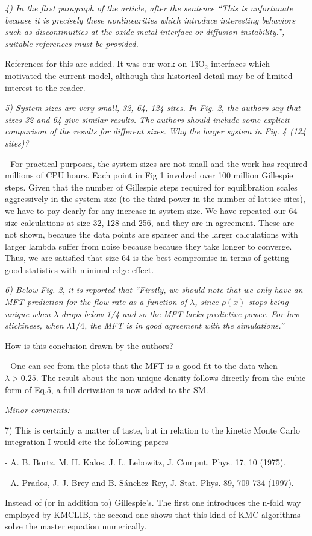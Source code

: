 \documentclass[a4paper,10pt]{article}
\begin{document}
{\it    4) In the first paragraph of the article, after the sentence ``This is
   unfortunate because it is precisely these nonlinearities which
   introduce interesting behaviors such as discontinuities at the
   oxide-metal interface or diffusion instability.'', suitable references
   must be provided.}
  
   References for this are added.  It was our work on $\mathrm{TiO}_2$ interfaces
   which motivated the current model, although this historical
   detail may be of limited interest to the reader.
  
{\it   5) System sizes are very small, 32, 64, 124 sites. In Fig. 2, the
   authors say that sizes 32 and 64 give similar results. The authors
   should include some explicit comparison of the results for different
   sizes. Why the larger system in Fig. 4 (124 sites)?}
  
   - For practical purposes, the system sizes are not small and the
   work has required millions of CPU hours. Each point in Fig 1
   involved over 100 million Gillespie steps. Given that the number of
   Gillespie steps required for equilibration scales aggressively in
   the system size (to the third power in the number of lattice
   sites), we have to pay dearly for any increase in system size. We
   have repeated our 64-size calculations at size 32, 128 and 256, and
   they are in agreement.  These are not shown, because the data
   points are sparser and the larger calculations with larger lambda
   suffer from noise because because they take longer to converge.
   Thus, we are satisfied that size 64 is the best compromise in terms
   of getting good statistics with minimal edge-effect.

  
{\it    6) Below Fig. 2, it is reported that ``Firstly, we should note that we
   only have an MFT prediction for the flow rate as a function of
   $\lambda$, since $\rho(x)$ stops being unique when $\lambda$ drops
   below 1/4 and so the MFT lacks predictive power. For low-stickiness,
   when $\lambda 1/4$, the MFT is in good agreement with the
   simulations.''
  
   How is this conclusion drawn by the authors?}
  
   - One can see from the plots that the MFT is a good fit to the data
   when $\lambda>0.25$. The result about the non-unique density follows directly from the cubic form of Eq.5, a full derivation is now added to the SM.
  

{\it 
   Minor comments:
  
   7) This is certainly a matter of taste, but in relation to the kinetic
   Monte Carlo integration I would cite the following papers
  
   - A. B. Bortz, M. H. Kalos, J. L. Lebowitz, J. Comput. Phys. 17, 10
   (1975).
  
   - A. Prados, J. J. Brey and B. Sánchez-Rey, J. Stat. Phys. 89, 709-734
   (1997).
  
   Instead of (or in addition to) Gillespie's. The first one introduces
   the n-fold way employed by KMCLIB, the second one shows that this kind
   of KMC algorithms solve the master equation numerically.
  }
\end{document}
